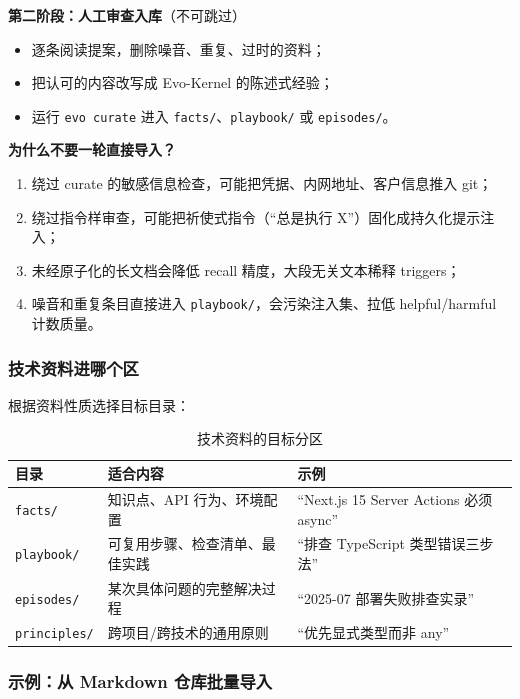 \documentclass[12pt,a4paper]{ctexart}
\begin{document}
\textbf{第二阶段：人工审查入库}（不可跳过）

\begin{itemize}
  \item 逐条阅读提案，删除噪音、重复、过时的资料；
  \item 把认可的内容改写成 Evo-Kernel 的陈述式经验；
  \item 运行 \texttt{evo curate} 进入 \texttt{facts/}、\texttt{playbook/} 或 \texttt{episodes/}。
\end{itemize}

\begin{redbox}
\textbf{为什么不要一轮直接导入？}
\begin{enumerate}
  \item 绕过 curate 的敏感信息检查，可能把凭据、内网地址、客户信息推入 git；
  \item 绕过指令样审查，可能把祈使式指令（``总是执行 X''）固化成持久化提示注入；
  \item 未经原子化的长文档会降低 recall 精度，大段无关文本稀释 triggers；
  \item 噪音和重复条目直接进入 \texttt{playbook/}，会污染注入集、拉低 helpful/harmful 计数质量。
\end{enumerate}
\end{redbox}

\subsubsection{技术资料进哪个区}

根据资料性质选择目标目录：

\begin{table}[H]
\centering
\caption{技术资料的目标分区}
\begin{tabular}{@{}lp{4.5cm}p{5.5cm}@{}}
\toprule
\textbf{目录} & \textbf{适合内容} & \textbf{示例} \\
\midrule
\texttt{facts/} & 知识点、API 行为、环境配置 & ``Next.js 15 Server Actions 必须 async'' \\
\texttt{playbook/} & 可复用步骤、检查清单、最佳实践 & ``排查 TypeScript 类型错误三步法'' \\
\texttt{episodes/} & 某次具体问题的完整解决过程 & ``2025-07 部署失败排查实录'' \\
\texttt{principles/} & 跨项目/跨技术的通用原则 & ``优先显式类型而非 any'' \\
\bottomrule
\end{tabular}
\end{table}

\subsubsection{示例：从 Markdown 仓库批量导入}
\end{document}
